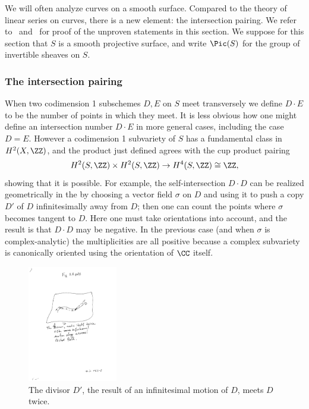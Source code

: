  We will often analyze curves  on a smooth surface. Compared to the theory of linear series on curves, there is a new element: the intersection pairing. We refer to~\cite[Chapter V]{Hartshorne1977}
 and~\cite[Chapter I]{Beauville} for proof of the unproven statements in this section.
 We suppose for this section that $S$ is a smooth projective surface,
 and write $\Pic(S)$ for the group of invertible sheaves on $S$.

\subsubsection{The intersection pairing}

When two codimension 1 subschemes $D,E$ on $S$ meet transversely we define $D\cdot E$ to be the number of points in which they meet.  
It is less obvious how one might define an intersection number $D\cdot E$ in more general cases,
including the case $D=E$. However 
a codimension 1 subvariety of $S$ has a fundamental class in $H^{2}(X,\ZZ)$, and the product just defined
agrees with the cup product pairing 
$$
H^{2}(S,\ZZ) \times H^{2}(S,\ZZ) \to H^4(S,\ZZ)\cong \ZZ,
$$
showing that it is possible. For example, the self-intersection $D\cdot D$ can be realized geometrically in the 
 by choosing a  vector field $\sigma$ on $D$ and using it to push a copy $D'$ of $D$ infinitesimally away from $D$; then
 one can count the points where $\sigma$ becomes tangent to $D$. Here one must take orientations into account,
 and the result is that $D\cdot D$ may be negative. In the previous case (and when $\sigma$ is complex-analytic)
 the multiplicities are all positive because a complex subvariety is canonically oriented using the orientation of $\CC$
 itself.

\begin{figure}
 \caption{The divisor $D'$, the result of an infinitesimal motion of $D$, meets $D$ twice. }
\centerline {\includegraphics[height=2in]{"Fig2.3.pdf"}}
\end{figure}

